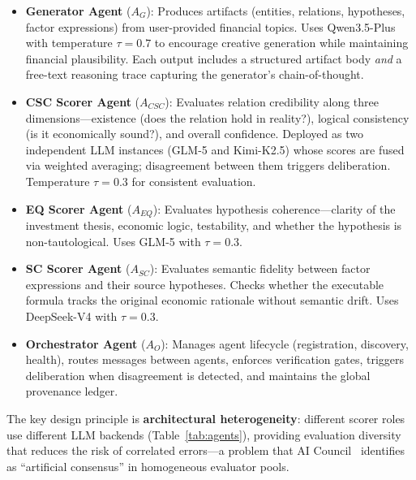 \documentclass[sigconf]{acmart}
\begin{document}
\begin{itemize}
    \item \textbf{Generator Agent} ($A_G$): Produces artifacts (entities, relations, hypotheses, factor expressions) from user-provided financial topics. Uses Qwen3.5-Plus with temperature $\tau=0.7$ to encourage creative generation while maintaining financial plausibility. Each output includes a structured artifact body \emph{and} a free-text reasoning trace capturing the generator's chain-of-thought.
    \item \textbf{CSC Scorer Agent} ($A_{CSC}$): Evaluates relation credibility along three dimensions---existence (does the relation hold in reality?), logical consistency (is it economically sound?), and overall confidence. Deployed as two independent LLM instances (GLM-5 and Kimi-K2.5) whose scores are fused via weighted averaging; disagreement between them triggers deliberation. Temperature $\tau=0.3$ for consistent evaluation.
    \item \textbf{EQ Scorer Agent} ($A_{EQ}$): Evaluates hypothesis coherence---clarity of the investment thesis, economic logic, testability, and whether the hypothesis is non-tautological. Uses GLM-5 with $\tau=0.3$.
    \item \textbf{SC Scorer Agent} ($A_{SC}$): Evaluates semantic fidelity between factor expressions and their source hypotheses. Checks whether the executable formula tracks the original economic rationale without semantic drift. Uses DeepSeek-V4 with $\tau=0.3$.
    \item \textbf{Orchestrator Agent} ($A_O$): Manages agent lifecycle (registration, discovery, health), routes messages between agents, enforces verification gates, triggers deliberation when disagreement is detected, and maintains the global provenance ledger.
\end{itemize}

The key design principle is \textbf{architectural heterogeneity}: different scorer roles use different LLM backends (Table~\ref{tab:agents}), providing evaluation diversity that reduces the risk of correlated errors---a problem that AI Council~\cite{ghafarollahi2024sciagents} identifies as ``artificial consensus'' in homogeneous evaluator pools.
\end{document}
